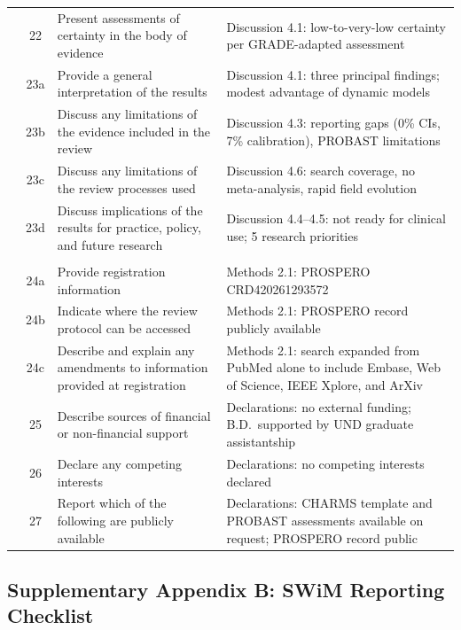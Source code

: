 \documentclass[11pt,a4paper]{article}
\begin{document}
\begin{small}
\begin{longtable}{@{}p{1.8cm}cp{5cm}p{6.5cm}@{}}
         & 22 & Present assessments of certainty in the body of evidence & Discussion 4.1: low-to-very-low certainty per GRADE-adapted assessment \\
         & 23a & Provide a general interpretation of the results & Discussion 4.1: three principal findings; modest advantage of dynamic models \\
         & 23b & Discuss any limitations of the evidence included in the review & Discussion 4.3: reporting gaps (0\% CIs, 7\% calibration), PROBAST limitations \\
         & 23c & Discuss any limitations of the review processes used & Discussion 4.6: search coverage, no meta-analysis, rapid field evolution \\
         & 23d & Discuss implications of the results for practice, policy, and future research & Discussion 4.4--4.5: not ready for clinical use; 5 research priorities \\
\addlinespace
\multicolumn{4}{@{}l}{\textbf{OTHER INFORMATION}} \\
         & 24a & Provide registration information & Methods 2.1: PROSPERO CRD420261293572 \\
         & 24b & Indicate where the review protocol can be accessed & Methods 2.1: PROSPERO record publicly available \\
         & 24c & Describe and explain any amendments to information provided at registration & Methods 2.1: search expanded from PubMed alone to include Embase, Web of Science, IEEE Xplore, and ArXiv \\
         & 25 & Describe sources of financial or non-financial support & Declarations: no external funding; B.D.\ supported by UND graduate assistantship \\
         & 26 & Declare any competing interests & Declarations: no competing interests declared \\
         & 27 & Report which of the following are publicly available & Declarations: CHARMS template and PROBAST assessments available on request; PROSPERO record public \\
\end{longtable}
\end{small}

\clearpage
\subsection*{Supplementary Appendix B: SWiM Reporting Checklist}
\end{document}
